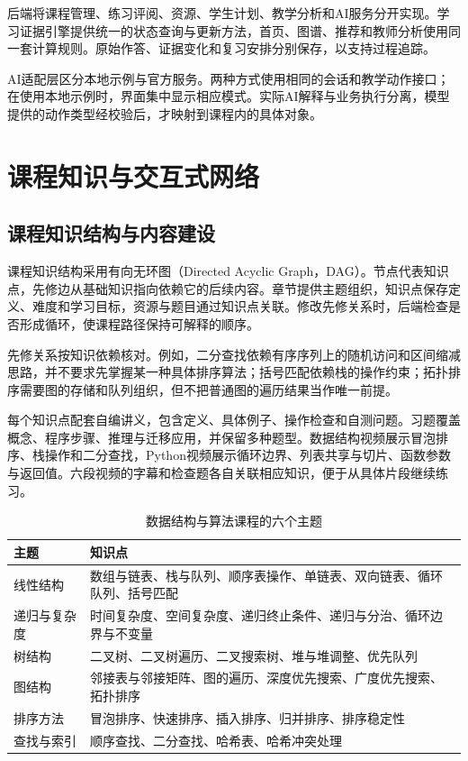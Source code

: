 \documentclass[UTF8,zihao=-4,fontset=none,a4paper]{ctexart}
\begin{document}
后端将课程管理、练习评阅、资源、学生计划、教学分析和AI服务分开实现。学习证据引擎提供统一的状态查询与更新方法，首页、图谱、推荐和教师分析使用同一套计算规则。原始作答、证据变化和复习安排分别保存，以支持过程追踪。

AI适配层区分本地示例与官方服务。两种方式使用相同的会话和教学动作接口；在使用本地示例时，界面集中显示相应模式。实际AI解释与业务执行分离，模型提供的动作类型经校验后，才映射到课程内的具体对象。


\section{课程知识与交互式网络}

\subsection{课程知识结构与内容建设}

课程知识结构采用有向无环图（Directed Acyclic Graph，DAG）。节点代表知识点，先修边从基础知识指向依赖它的后续内容。章节提供主题组织，知识点保存定义、难度和学习目标，资源与题目通过知识点关联。修改先修关系时，后端检查是否形成循环，使课程路径保持可解释的顺序。



先修关系按知识依赖核对。例如，二分查找依赖有序序列上的随机访问和区间缩减思路，并不要求先掌握某一种具体排序算法；括号匹配依赖栈的操作约束；拓扑排序需要图的存储和队列组织，但不把普通图的遍历结果当作唯一前提。

每个知识点配套自编讲义，包含定义、具体例子、操作检查和自测问题。习题覆盖概念、程序步骤、推理与迁移应用，并保留多种题型。数据结构视频展示冒泡排序、栈操作和二分查找，Python视频展示循环边界、列表共享与切片、函数参数与返回值。六段视频的字幕和检查题各自关联相应知识，便于从具体片段继续练习。

\begin{table}[H]\centering\caption{数据结构与算法课程的六个主题}\begin{tabularx}{\linewidth}{p{2.5cm}Y}\toprule 主题&知识点\\\midrule 线性结构&数组与链表、栈与队列、顺序表操作、单链表、双向链表、循环队列、括号匹配\\递归与复杂度&时间复杂度、空间复杂度、递归终止条件、递归与分治、循环边界与不变量\\树结构&二叉树、二叉树遍历、二叉搜索树、堆与堆调整、优先队列\\图结构&邻接表与邻接矩阵、图的遍历、深度优先搜索、广度优先搜索、拓扑排序\\排序方法&冒泡排序、快速排序、插入排序、归并排序、排序稳定性\\查找与索引&顺序查找、二分查找、哈希表、哈希冲突处理\\\bottomrule\end{tabularx}\end{table}
\end{document}
